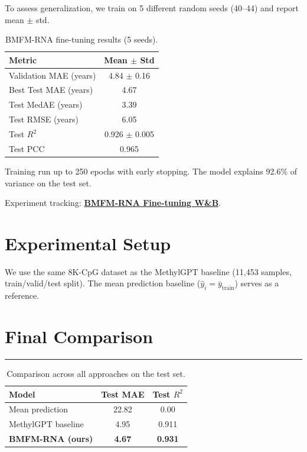 \documentclass[11pt]{article}
\begin{document}
To assess generalization, we train on 5 different random seeds (40--44) and report mean $\pm$ std.

\begin{table}[h]
\centering
\caption{BMFM-RNA fine-tuning results (5 seeds).}
\label{tab:bmfm_results}
\begin{tabular}{lc}
\toprule
Metric & Mean $\pm$ Std \\
\midrule
Validation MAE (years) & 4.84 $\pm$ 0.16 \\
Best Test MAE (years) & 4.67 \\
Test MedAE (years) & 3.39 \\
Test RMSE (years) & 6.05 \\
Test $R^2$ & 0.926 $\pm$ 0.005 \\
Test PCC & 0.965 \\
\bottomrule
\end{tabular}
\end{table}

\noindent Training run up to 250 epochs with early stopping. The model explains 92.6\% of variance on the test set.

\noindent Experiment tracking: \href{https://wandb.ai/netanelazran11-hebrew-university-of-jerusalem/finetune-bmfm-multiseed?nw=nwusernetanelazran11}{\textbf{BMFM-RNA Fine-tuning W\&B}}.

\section{Experimental Setup}

We use the same 8K-CpG dataset as the MethylGPT baseline (11{,}453 samples, train/valid/test split). The mean prediction baseline ($\hat{y}_i = \bar{y}_{\text{train}}$) serves as a reference.

\section{Final Comparison}
\vspace{-0.3em}
\hrule
\vspace{0.8em}

\begin{table}[h]
\centering
\caption{Comparison across all approaches on the test set.}
\label{tab:all_comparison}
\begin{tabular}{lcc}
\toprule
Model & Test MAE & Test $R^2$ \\
\midrule
Mean prediction & 22.82 & 0.00 \\
MethylGPT baseline & 4.95 & 0.911 \\
\textbf{BMFM-RNA (ours)} & \textbf{4.67} & \textbf{0.931} \\
\bottomrule
\end{tabular}
\end{table}
\end{document}
